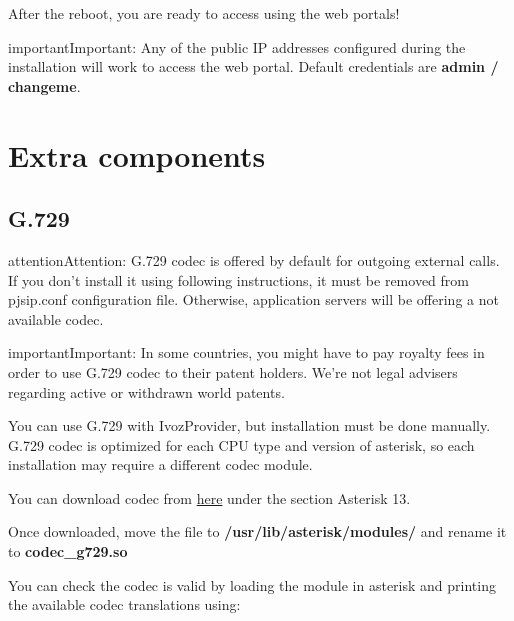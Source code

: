 \documentclass[letterpaper,10pt,english]{sphinxmanual}
\begin{document}
\noindent{}

After the reboot, you are ready to access using the web portals!

\begin{notice}{important}{Important:}
Any of the public IP addresses configured during the
installation will work to access the web portal. Default credentials are
\textbf{admin / changeme}.
\end{notice}


\section{Extra components}
\label{basic_concepts/installation/extra_components::doc}\label{basic_concepts/installation/extra_components:extra-components}

\subsection{G.729}
\label{basic_concepts/installation/extra_components:g-729}
\begin{notice}{attention}{Attention:}
G.729 codec is offered by default for outgoing external calls. If you
don't install it using following instructions, it must be removed from pjsip.conf
configuration file. Otherwise, application servers will be offering a not available codec.
\end{notice}

\begin{notice}{important}{Important:}
In some countries, you might have to pay royalty fees in order to
use G.729 codec to their patent holders. We're not legal advisers regarding
active or withdrawn world patents.
\end{notice}

You can use G.729 with IvozProvider, but installation must be done manually.
G.729 codec is optimized for each CPU type and version of asterisk, so each
installation may require a different codec module.

You can download codec from \href{http://asterisk.hosting.lv/}{here} under the
section Asterisk 13.

Once downloaded, move the  file to \textbf{/usr/lib/asterisk/modules/} and rename
it to \textbf{codec\_g729.so}

You can check the codec is valid by loading the module in asterisk and printing the
available codec translations using:
\end{document}
